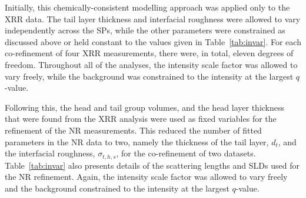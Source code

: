 Initially, this chemically-consistent modelling approach was applied only to the XRR data.
The tail layer thickness and interfacial roughness were allowed to vary independently across the SPs, while the other parameters were constrained as discussed above or held constant to the values given in Table~\ref{tab:invar}.
For each co-refinement of four XRR measurements, there were, in total, eleven degrees of freedom.
Throughout all of the analyses, the intensity scale factor was allowed to vary freely, while the background was constrained to the intensity at the largest $q$-value.

Following this, the head and tail group volumes, and the head layer thickness that were found from the XRR analysis were used as fixed variables for the refinement of the NR measurements.
This reduced the number of fitted parameters in the NR data to two, namely the thickness of the tail layer, $d_t$, and the interfacial roughness, $\sigma_{t,h,s}$, for the co-refinement of two datasets.
Table~\ref{tab:invar} also presents details of the scattering lengths and SLDs used for the NR refinement.
Again, the intensity scale factor was allowed to vary freely and the background constrained to the intensity at the largest $q$-value.

